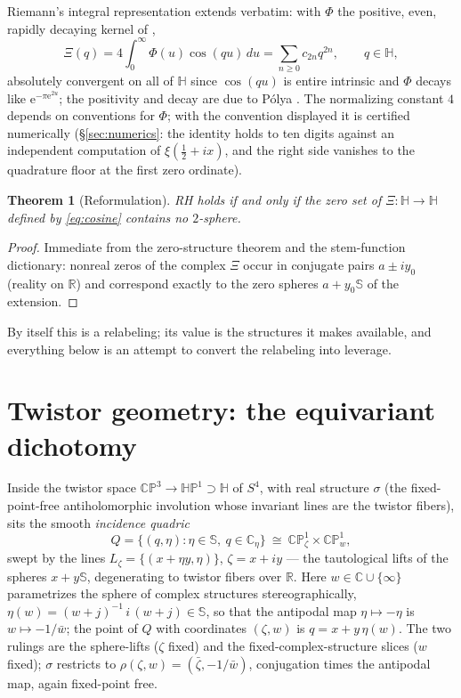\documentclass[11pt]{amsart}
\theoremstyle{plain}
\newtheorem{mainthm}{Theorem}
\theoremstyle{definition}
\theoremstyle{remark}
\newcommand{\HH}{\mathbb{H}}
\newcommand{\CC}{\mathbb{C}}
\newcommand{\RR}{\mathbb{R}}
\newcommand{\CP}{\mathbb{CP}}
\newcommand{\HP}{\mathbb{HP}}
\renewcommand{\SS}{\mathbb{S}}
\newcommand{\eE}{\mathrm{e}}
\newcommand{\dd}{\,d}
\begin{document}
Riemann's integral representation extends verbatim: with $\Phi$ the positive, even, rapidly
decaying kernel of \cite[\S10.1]{Titchmarsh1986},
\begin{equation}\label{eq:cosine}
\Xi(q)=4\int_0^\infty\Phi(u)\cos(qu)\dd u=\sum_{n\ge0}c_{2n}q^{2n},\qquad q\in\HH,
\end{equation}
absolutely convergent on all of $\HH$ since $\cos(qu)$ is entire intrinsic and $\Phi$ decays like
$\eE^{-\pi\eE^{2u}}$; the positivity and decay are due to P\'olya \cite{Polya1926}. The
normalizing constant $4$ depends on conventions for $\Phi$; with the convention displayed it is
certified numerically (\S\ref{sec:numerics}: the identity holds to ten digits against an
independent computation of $\xi(\tfrac12+ix)$, and the right side vanishes to the quadrature
floor at the first zero ordinate).

\begin{mainthm}[Reformulation]\label{thm:A}
RH holds if and only if the zero set of $\Xi:\HH\to\HH$ defined by \eqref{eq:cosine} contains no
$2$-sphere.
\end{mainthm}

\begin{proof}
Immediate from the zero-structure theorem and the stem-function dictionary: nonreal zeros of the
complex $\Xi$ occur in conjugate pairs $a\pm iy_0$ (reality on $\RR$) and correspond exactly to the
zero spheres $a+y_0\SS$ of the extension.
\end{proof}

By itself this is a relabeling; its value is the structures it makes available, and everything
below is an attempt to convert the relabeling into leverage.

\section{Twistor geometry: the equivariant dichotomy}\label{sec:twistor}

Inside the twistor space $\CP^3\to\HP^1\supset\HH$ of $S^4$, with real structure $\sigma$ (the
fixed-point-free antiholomorphic involution whose invariant lines are the twistor fibers), sits the
smooth \emph{incidence quadric}
\[
Q=\{(q,\eta):\eta\in\SS,\ q\in\CC_\eta\}\ \cong\ \CP^1_\zeta\times\CP^1_w ,
\]
swept by the lines $L_\zeta=\{(x+\eta y,\eta)\}$, $\zeta=x+iy$ --- the tautological lifts of the
spheres $x+y\SS$, degenerating to twistor fibers over $\RR$. Here $w\in\CC\cup\{\infty\}$
parametrizes the sphere of complex structures stereographically,
$\eta(w)=(w+j)^{-1}\,i\,(w+j)\in\SS$, so that the antipodal map $\eta\mapsto-\eta$ is
$w\mapsto-1/\bar w$; the point of $Q$ with coordinates $(\zeta,w)$ is $q=x+y\,\eta(w)$. The two
rulings are the sphere-lifts ($\zeta$ fixed) and the fixed-complex-structure slices ($w$ fixed);
$\sigma$ restricts to $\rho(\zeta,w)=(\bar\zeta,-1/\bar w)$, conjugation times the antipodal
map, again fixed-point free.
\end{document}
